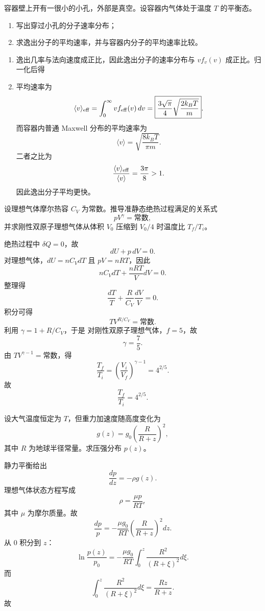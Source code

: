 \begin{question}
容器壁上开有一很小的小孔，外部是真空。设容器内气体处于温度 $T$ 的平衡态。
\begin{enumerate}[label=（\arabic*）,leftmargin=2.8em,itemsep=0.2em]
\item 写出穿过小孔的分子速率分布；
\item 求逸出分子的平均速率，并与容器内分子的平均速率比较。
\end{enumerate}
\begin{solution}

\begin{enumerate}[label=（\arabic*）,leftmargin=2.8em,itemsep=0.2em]
\item 逸出几率与法向速度成正比，因此逸出分子的速率分布与 $v f_v(v)$ 成正比。归一化后得

\item 平均速率为
\[
\langle v\rangle_{\rm eff}=\int_0^{\infty}v f_{\rm eff}(v)\,dv
=\boxed{\frac{3\sqrt\pi}{4}\sqrt{\frac{2k_BT}{m}}}.
\]
而容器内普通 Maxwell 分布的平均速率为
\[
\langle v\rangle=\sqrt{\frac{8k_BT}{\pi m}}.
\]
二者之比为
\[
\frac{\langle v\rangle_{\rm eff}}{\langle v\rangle}=\frac{3\pi}{8}>1.
\]
因此逸出分子平均更快。
\end{enumerate}
\end{solution}
\end{question}

\begin{question}
设理想气体摩尔热容 $C_V$ 为常数。推导准静态绝热过程满足的关系式
\[
pV^{\gamma}=\text{常数},
\]
并求刚性双原子理想气体从体积 $V_0$ 压缩到 $V_0/4$ 时温度比 $T_f/T_i$。
\begin{solution}

绝热过程中 $\delta Q=0$，故
\[
dU+p\,dV=0.
\]
对理想气体，$dU=nC_VdT$ 且 $pV=nRT$，因此
\[
nC_VdT+\frac{nRT}{V}dV=0.
\]
整理得
\[
\frac{dT}{T}+\frac{R}{C_V}\frac{dV}{V}=0.
\]
积分可得
\[
TV^{R/C_V}=\text{常数}.
\]
利用 $\gamma=1+R/C_V$，于是
对刚性双原子理想气体，$f=5$，故
\[
\gamma=\frac75.
\]
由 $TV^{\gamma-1}=\text{常数}$，得
\[
\frac{T_f}{T_i}=\left(\frac{V_i}{V_f}\right)^{\gamma-1}=4^{2/5}.
\]
故
\[
\frac{T_f}{T_i}=4^{2/5}.
\]
\end{solution}
\end{question}

\begin{question}
设大气温度恒定为 $T$，但重力加速度随高度变化为
\[
g(z)=g_0\left(\frac{R}{R+z}\right)^2,
\]
其中 $R$ 为地球半径常量。求压强分布 $p(z)$。
\begin{solution}

静力平衡给出
\[
\frac{dp}{dz}=-\rho g(z).
\]
理想气体状态方程写成
\[
\rho=\frac{\mu p}{RT},
\]
其中 $\mu$ 为摩尔质量。故
\[
\frac{dp}{p}=-\frac{\mu g_0}{RT}\left(\frac{R}{R+z}\right)^2dz.
\]
从 $0$ 积分到 $z$：
\[
\ln\frac{p(z)}{p_0}=-\frac{\mu g_0}{RT}\int_0^z\frac{R^2}{(R+\xi)^2}d\xi.
\]
而
\[
\int_0^z\frac{R^2}{(R+\xi)^2}d\xi=\frac{Rz}{R+z}.
\]
故
\end{solution}
\end{question}


